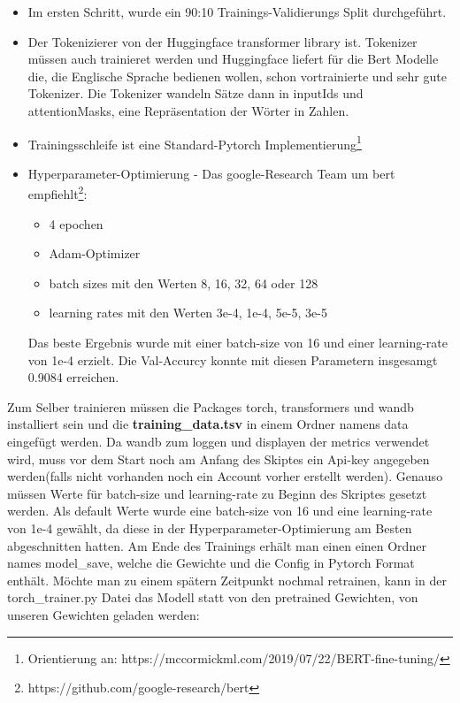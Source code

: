 \documentclass[10pt,a4paper]{article}
\begin{document}
\begin{itemize}
	\item Im ersten Schritt, wurde ein 90:10 Trainings-Validierungs Split durchgeführt. 
		
	\item Der Tokenizierer von der Huggingface transformer library ist. Tokenizer müssen auch trainieret werden und Huggingface liefert für die Bert Modelle die, die Englische Sprache bedienen wollen, schon vortrainierte und sehr gute Tokenizer. Die Tokenizer wandeln Sätze dann in inputIds und attentionMasks, eine Repräsentation der Wörter in Zahlen.

	\item Trainingsschleife ist eine Standard-Pytorch Implementierung\footnote{Orientierung an: https://mccormickml.com/2019/07/22/BERT-fine-tuning/}

	\item Hyperparameter-Optimierung - Das google-Research Team um bert empfiehlt\footnote{https://github.com/google-research/bert}:
		\begin{itemize}
			\item 4 epochen
			\item Adam-Optimizer
			\item batch sizes mit den Werten 8, 16, 32, 64 oder 128
			\item learning rates mit den Werten 3e-4, 1e-4, 5e-5, 3e-5
		\end{itemize}
		Das beste Ergebnis wurde mit einer batch-size von 16 und einer learning-rate von 1e-4 erzielt. Die Val-Accurcy konnte mit diesen Parametern insgesamgt 0.9084 erreichen.
\end{itemize}

Zum Selber trainieren müssen die Packages torch, transformers und wandb installiert sein und die \textbf{training\_data.tsv} in einem Ordner namens data eingefügt werden. Da wandb zum loggen und displayen der metrics verwendet wird, muss vor dem Start noch am Anfang des Skiptes ein Api-key angegeben werden(falls nicht vorhanden noch ein Account vorher erstellt werden). Genauso müssen Werte für batch-size und learning-rate zu Beginn des Skriptes gesetzt werden. Als default Werte wurde eine batch-size von 16 und eine learning-rate von 1e-4 gewählt, da diese in der Hyperparameter-Optimierung am Besten abgeschnitten hatten. Am Ende des Trainings erhält man einen einen Ordner names model\_save, welche die Gewichte und die Config in Pytorch Format enthält. Möchte man zu einem spätern Zeitpunkt nochmal retrainen, kann in der torch\_trainer.py Datei das Modell statt von den pretrained Gewichten, von unseren Gewichten geladen werden:
\end{document}

